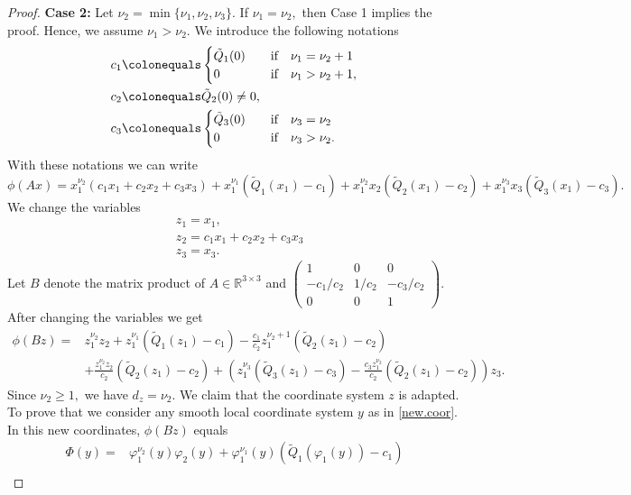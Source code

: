 \documentclass[a4paper, 11pt]{article}
\theoremstyle{plain}
\theoremstyle{definition}
\theoremstyle{lemma}
\theoremstyle{Remark}
\theoremstyle{proposition}
\theoremstyle{corollary}
\theoremstyle{example}
\theoremstyle{assumption}
\begin{document}
\begin{proof}
 \textbf{Case 2:} Let $\nu_2= \min\{\nu_1,\nu_2,\nu_3\}.$  If $\nu_1=\nu_2,$ then Case 1 implies the proof. Hence, we assume $\nu_1>\nu_2.$ %
 We introduce the following notations
 \begin{align*}
 c_1&\colonequals \begin{cases} \tilde Q_1(0)\quad &\mbox{if} \quad \nu_1=\nu_2+1\\
 0 \quad & \mbox{if} \quad \nu_1>\nu_2+1,
  \end{cases}\\
 c_2&\colonequals \tilde Q_2(0)\neq 0, \\
  c_3&\colonequals \begin{cases} \tilde Q_3(0)\quad &\mbox{if} \quad \nu_3=\nu_2\\
 0 \quad &\mbox{if} \quad \nu_3>\nu_2.
  \end{cases}
   \end{align*}
With these notations we can write
\begin{equation*}
\phi(Ax)=x_1^{\nu_2}(c_1x_1+c_2x_2+c_3x_3)+x_1^{\nu_1}(\tilde Q_1(x_1)-c_1)+x_1^{\nu_2}x_2(\tilde Q_2(x_1)-c_2)+
x_1^{\nu_3}x_3(\tilde Q_3(x_1)-c_3).
\end{equation*}
 We change the variables
\begin{align*}
&z_1=x_1,\\
&z_2=c_1x_1+c_2x_2+c_3x_3\\
&z_3=x_3.
\end{align*}
Let $B$ denote  the matrix  product of $A\in \mathbb{R}^{3\times 3}$ and $\begin{pmatrix}
1&0&0\\
-c_1/c_2&1/c_2&-c_3/c_2\\
0&0&1
\end{pmatrix}. $
After changing the variables we get
\begin{align*}
\phi(Bz)=&z_1^{\nu_2}z_2+z_1^{\nu_1}(\tilde Q_1(z_1)-c_1)-\frac{c_1}{c_2}z_1^{\nu_2+1}(\tilde Q_2(z_1)-c_2)\\ &+\frac{z_1^{\nu_2}z_2}{c_2}(\tilde Q_2(z_1)-c_2)+\left(z_1^{\nu_3}(\tilde Q_3(z_1)-c_3)-\frac{c_3z_1^{\nu_2} }{c_2}(\tilde Q_2(z_1)-c_2)\right)z_3.
\end{align*}
Since $\nu_2\geq 1,$ we have $d_z=\nu_2.$ We claim that the coordinate system $z$ is adapted. To prove that we consider any smooth local coordinate system $y$ as in  \eqref{new.coor}. In this new coordinates, $\phi(Bz)$  equals
\begin{align*}
\Phi(y)=&
\varphi_1^{\nu_2}(y)\varphi_2(y)+\varphi_1^{\nu_1}(y)(\tilde Q_1(\varphi_1(y))-c_1)\\

\end{align*}
\end{proof}
\end{document}
